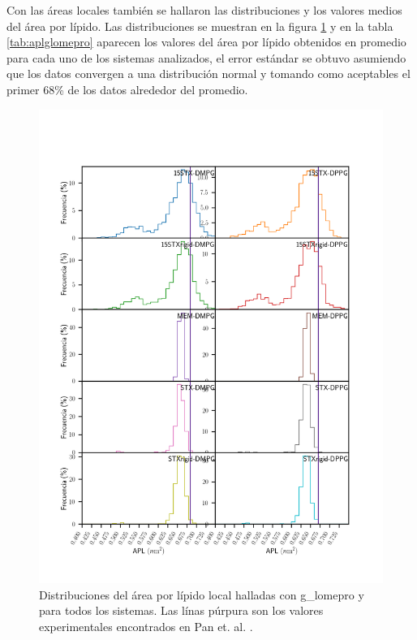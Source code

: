 Con las \'{a}reas locales tambi\'{e}n se hallaron las distribuciones y los valores medios del \'{a}rea por l\'{i}pido. Las distribuciones se muestran en la figura  \ref{fig:aplglomepro} y en la tabla \ref{tab:aplglomepro} aparecen los valores del \'{a}rea por l\'{i}pido obtenidos en promedio para cada uno de los sistemas analizados, el error est\'{a}ndar se obtuvo asumiendo que los datos convergen a una distribuci\'{o}n normal y tomando como aceptables el primer 68\% de los datos alrededor del promedio. \\
\begin{figure}
\begin{center}
    \includegraphics[scale=0.3,trim={0 3cm 0 6cm},clip]{Plots/APL_hist_lipids_g_lomepro.png}
  \caption{Distribuciones del \'{a}rea por l\'{i}pido local halladas con g\_lomepro y para todos los sistemas. Las l\'{i}nas p\'{u}rpura son los valores experimentales encontrados en Pan et. al. \cite{Pan2012}.}
  \label{fig:aplglomepro}
\end{center}
\end{figure}

